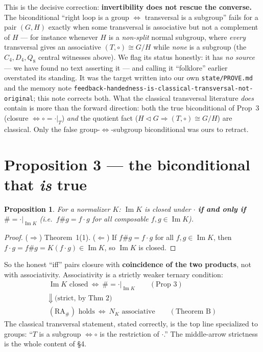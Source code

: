 \documentclass[11pt]{article}
\theoremstyle{plain}
\newtheorem{proposition}[theorem]{Proposition}
\theoremstyle{definition}
\theoremstyle{remark}
\renewcommand{\Im}{\operatorname{Im}}
\newcommand{\NK}{N_K}
\begin{document}
This is the decisive correction: \textbf{invertibility does not rescue the converse.} The
biconditional ``right loop is a group $\iff$ transversal is a subgroup'' fails for a pair $(G,H)$
exactly when some transversal is associative but not a complement of $H$ --- for instance whenever
$H$ is a \emph{non-split} normal subgroup, where \emph{every} transversal gives an associative
$(T,\circ)\cong G/H$ while \emph{none} is a subgroup (the $C_4,D_4,Q_8$ central witnesses above). We
flag its status honestly: it has \emph{no source} ---
we have found no text asserting it --- and calling it ``folklore'' earlier overstated its standing.
It was the target written into our own \texttt{state/PROVE.md} and the memory note
\texttt{feedback-handedness-is-classical-transversal-not-original}; this note corrects both. What
the classical transversal literature \emph{does} contain is more than the forward direction: both
the true biconditional of Prop~3 (closure $\iff \circ=\cdot|_T$) \emph{and} the quotient fact
($H\triangleleft G\Rightarrow(T,\circ)\cong G/H$) are classical. Only the false
group-$\iff$-subgroup biconditional was ours to retract.

\section{Proposition 3 --- the biconditional that \emph{is} true}

\begin{proposition}
For a normalizer $K$: $\Im K$ is closed under $\cdot$ \textbf{if and only if} $\# = \cdot|_{\Im K}$
(i.e.\ $f\#g = f\cdot g$ for all composable $f,g \in \Im K$).
\end{proposition}

\begin{proof}
($\Rightarrow$) Theorem~1(1). ($\Leftarrow$) If $f\#g = f\cdot g$ for all $f,g \in \Im K$, then
$f\cdot g = f\#g = K(f\cdot g) \in \Im K$, so $\Im K$ is closed.
\end{proof}

So the honest ``iff'' pairs closure with \textbf{coincidence of the two products}, not with
associativity. Associativity is a strictly weaker ternary condition:
\[
\begin{array}{c}
\Im K \text{ closed} \ \iff\ \# = \cdot|_{\Im K} \qquad (\text{Prop 3}) \\[4pt]
\Downarrow \ \text{(strict, by Thm 2)} \\[4pt]
(\mathrm{RA}_\#) \text{ holds} \ \iff\ \NK \text{ associative} \qquad (\text{Theorem B})
\end{array}
\]
The classical transversal statement, stated correctly, is the top line specialized to groups:
``$T$ is a subgroup $\iff \circ$ is the restriction of $\cdot$.'' The middle-arrow strictness is
the whole content of \S4.
\end{document}
